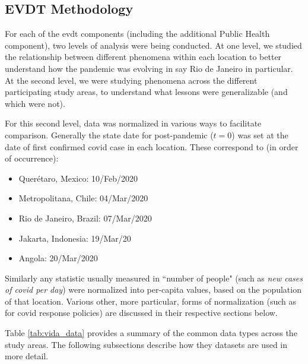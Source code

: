 \subsection{EVDT Methodology} \label{sec:vida-evdt-method}

For each of the \ac{evdt} components (including the additional Public Health component), two levels of analysis were being conducted. At one level, we studied the relationship between different phenomena within each location to better understand how the pandemic was evolving in say Rio de Janeiro in particular. At the second level, we were studying phenomena across the different participating study areas, to understand what lessons were generalizable (and which were not). 

For this second level, data was normalized in various ways to facilitate comparison. Generally the state date for post-pandemic ($t=0$) was set at the date of first confirmed \ac{covid} case in each location. These correspond to (in order of occurrence):

 \begin{itemize}[itemsep=0pt,parsep=0pt]
	\item{Querétaro, Mexico: 10/Feb/2020}
	\item{Metropolitana, Chile: 04/Mar/2020}
	\item{Rio de Janeiro, Brazil: 07/Mar/2020}
	\item{Jakarta, Indonesia: 19/Mar/20}
	\item{Angola: 20/Mar/2020}
\end{itemize}

Similarly any statistic usually measured in ``number of people" (such as \textit{new cases of \ac{covid} per day}) were normalized into per-capita values, based on the population of that location. Various other, more particular, forms of normalization (such as for \ac{covid} response policies) are discussed in their respective sections below.

Table \ref{tab:vida_data} provides a summary of the common data types across the study areas. The following subsections describe how they datasets are used in more detail.

